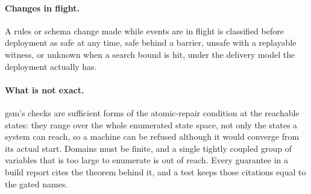 \paragraph{Changes in flight.} A rules or schema change made while events are in flight is classified
before deployment as safe at any time, safe behind a barrier, unsafe with a replayable witness, or
unknown when a search bound is hit, under the delivery model the deployment actually has.

\paragraph{What is not exact.} gsm's checks are sufficient forms of the atomic-repair condition at the reachable states:
they range over the whole enumerated state space, not only the states a system can reach, so a machine
can be refused although it would converge from its actual start. Domains must be finite, and a single
tightly coupled group of variables that is too large to enumerate is out of reach. Every guarantee in
a build report cites the theorem behind it, and a test keeps those citations equal to the gated names.
